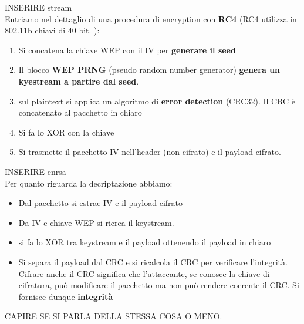 \documentclass[12pt]{article}
\begin{document}
				INSERIRE stream\\
				
				Entriamo nel dettaglio di una procedura di encryption con \textbf{RC4} (RC4 utilizza in 802.11b chiavi di 40 bit.
				):
				\begin{enumerate}
					\item Si concatena la chiave WEP con il IV per \textbf{generare il seed}
					\item Il blocco \textbf{WEP PRNG} (pseudo random number generator) \textbf{genera un kyestream a partire dal seed}.
					\item sul plaintext si applica un algoritmo di \textbf{error detection} (CRC32). Il CRC è concatenato al pacchetto in chiaro
					\item Si fa lo XOR con la chiave
					\item Si trasmette il pacchetto IV nell'header (non cifrato) e il payload cifrato.  
				\end{enumerate} 
				
				INSERIRE enrsa\\
				
				Per quanto riguarda la decriptazione abbiamo:
				\begin{itemize}
					\item Dal pacchetto si estrae IV e il payload cifrato
					\item Da IV e chiave WEP si ricrea il keystream. 
					\item si fa lo XOR tra keystream e il payload ottenendo il payload in chiaro
					\item Si separa il payload dal CRC e si ricalcola il CRC per verificare l'integrità. Cifrare anche il CRC significa che l'attaccante, se conosce la chiave di cifratura, può modificare il pacchetto ma non può rendere coerente il CRC. Si fornisce dunque \textbf{integrità}
				\end{itemize}
				CAPIRE SE SI PARLA DELLA STESSA COSA O MENO.\\
				
\end{document}
